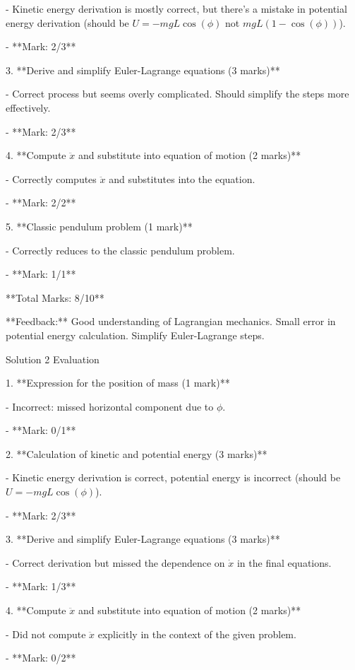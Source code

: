 \documentclass[a4paper,11pt]{article}
\begin{document}
   - Kinetic energy derivation is mostly correct, but there's a mistake in potential energy derivation (should be \( U = -mgL \cos(\phi) \) not \( mgL(1 - \cos(\phi)) \)).
   
   - **Mark: 2/3**

3. **Derive and simplify Euler-Lagrange equations (3 marks)**

   - Correct process but seems overly complicated. Should simplify the steps more effectively.
   
   - **Mark: 2/3**

4. **Compute \( \ddot{x} \) and substitute into equation of motion (2 marks)**

   - Correctly computes \( \ddot{x} \) and substitutes into the equation.
   
   - **Mark: 2/2**

5. **Classic pendulum problem (1 mark)**

   - Correctly reduces to the classic pendulum problem.
   
   - **Mark: 1/1**

**Total Marks: 8/10**

**Feedback:** Good understanding of Lagrangian mechanics. Small error in potential energy calculation. Simplify Euler-Lagrange steps.

Solution 2 Evaluation

1. **Expression for the position of mass (1 mark)**

   - Incorrect: missed horizontal component due to \( \phi \).
   
   - **Mark: 0/1**

2. **Calculation of kinetic and potential energy (3 marks)**

   - Kinetic energy derivation is correct, potential energy is incorrect (should be \( U = -mgL \cos(\phi) \)).
   
   - **Mark: 2/3**

3. **Derive and simplify Euler-Lagrange equations (3 marks)**

   - Correct derivation but missed the dependence on \( \dot{x} \) in the final equations.
   
   - **Mark: 1/3**

4. **Compute \( \ddot{x} \) and substitute into equation of motion (2 marks)**

   - Did not compute \( \ddot{x} \) explicitly in the context of the given problem.
   
   - **Mark: 0/2**
\end{document}

